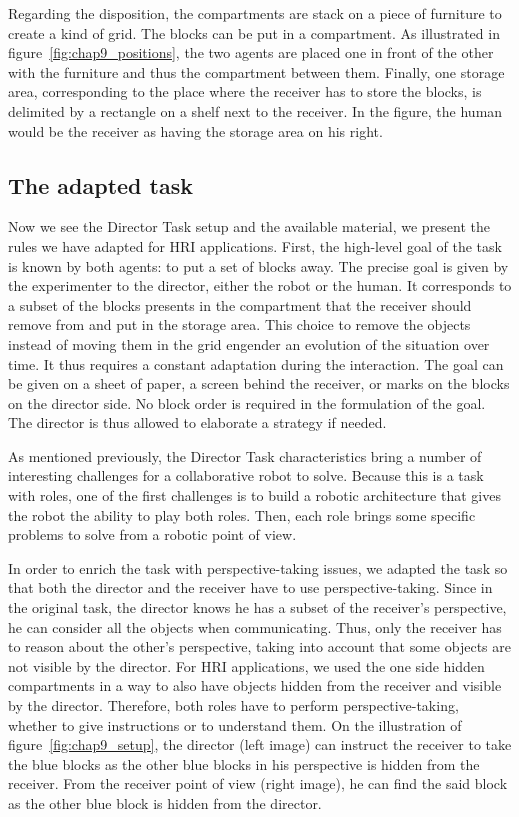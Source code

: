 Regarding the disposition, the compartments are stack on a piece of furniture to create a kind of grid. The blocks can be put in a compartment. As illustrated in figure~\ref{fig:chap9_positions}, the two agents are placed one in front of the other with the furniture and thus the compartment between them. Finally, one storage area, corresponding to the place where the receiver has to store the blocks, is delimited by a rectangle on a shelf next to the receiver. In the figure, the human would be the receiver as having the storage area on his right.

\subsection{The adapted task}

Now we see the Director Task setup and the available material, we present the rules we have adapted for HRI applications. First, the high-level goal of the task is known by both agents: to put a set of blocks away. The precise goal is given by the experimenter to the director, either the robot or the human. It corresponds to a subset of the blocks presents in the compartment that the receiver should remove from and put in the storage area. This choice to remove the objects instead of moving them in the grid engender an evolution of the situation over time. It thus requires a constant adaptation during the interaction. The goal can be given on a sheet of paper, a screen behind the receiver, or marks on the blocks on the director side. No block order is required in the formulation of the goal. The director is thus allowed to elaborate a strategy if needed.

As mentioned previously, the Director Task characteristics bring a number of interesting challenges for a collaborative robot to solve. Because this is a task with roles, one of the first challenges is to build a robotic architecture that gives the robot the ability to play both roles. Then, each role brings some specific problems to solve from a robotic point of view.

In order to enrich the task with perspective-taking issues, we adapted the task so that both the director and the receiver have to use perspective-taking. Since in the original task, the director knows he has a subset of the receiver's perspective, he can consider all the objects when communicating. Thus, only the receiver has to reason about the other's perspective, taking into account that some objects are not visible by the director. For HRI applications, we used the one side hidden compartments in a way to also have objects hidden from the receiver and visible by the director. Therefore, both roles have to perform perspective-taking, whether to give instructions or to understand them. On the illustration of figure~\ref{fig:chap9_setup}, the director (left image) can instruct the receiver to take the blue blocks as the other blue blocks in his perspective is hidden from the receiver. From the receiver point of view (right image), he can find the said block as the other blue block is hidden from the director.

